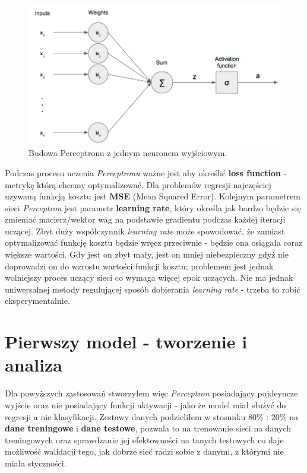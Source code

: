 \documentclass[12pt]{aghdpl}
\newenvironment{tightcenter}{
  \setlength\topsep{0pt}
  \setlength\parskip{0pt}
  \begin{center}
}{
  \end{center}
}
\begin{document}
		\begin{figure}[h]
	 		\begin{tightcenter}
	 			\includegraphics[width = 0.75\linewidth]{rysunki/perceptron.png}
			\end{tightcenter}	 			
	 			
 			\caption{Budowa Perceptronu z jednym neuronem wyjściowym.}
			\label{fig: budowa_perceptronu}
		\end{figure}

		Podczas procesu uczenia \textit{Perceptronu} ważne jest aby określić \textbf{loss function} - metrykę którą chcemy optymalizować. Dla problemów regresji najczęściej uzywaną funkcją kosztu jest \textbf{MSE} (Mean Squared Error). Kolejnym parametrem sieci \textit{Perceptron} jest parametr \textbf{learning rate}, który określa jak bardzo będzie się zmieniać macierz/wektor wag na podstawie gradientu podczas każdej iteracji uczącej. Zbyt duży współczynnik \textit{learning rate} może spowodować, że zamiast optymalizować funkcję kosztu będzie wręcz przeciwnie - będzie ona osiągała coraz większe wartości. Gdy jest on zbyt mały, jest on mniej niebezpieczny gdyż nie doprowadzi on do wzrostu wartości funkcji kosztu; problemem jest jednak wolniejszy proces uczący sieci co wymaga więcej epok uczących. Nie ma jednak uniwersalnej metody regulującej sposób dobierania \textit{learning rate} - trzeba to robić eksperymentalnie.
		
		\section{Pierwszy model - tworzenie i analiza} \label{pierwszy_model_tworzenie_i_analiza}
		Dla powyższych zastosowań stworzyłem więc \textit{Perceptron} posiadający pojdeyncze wyjście oraz nie posiadający funkcji aktywacji - jako że model miał służyć do regresji a nie klasyfikacji. Zestawy danych podzieliłem w stosunku 80\% : 20\% na \textbf{dane treningowe} i \textbf{dane testowe}, pozwala to na trenowanie sieci na danych treningowych oraz sprawdzanie jej efektowności na tanych testowych co daje możliwość walidacji tego, jak dobrze sieć radzi sobie z danymi, z którymi nie miała styczności.
		
\end{document}
